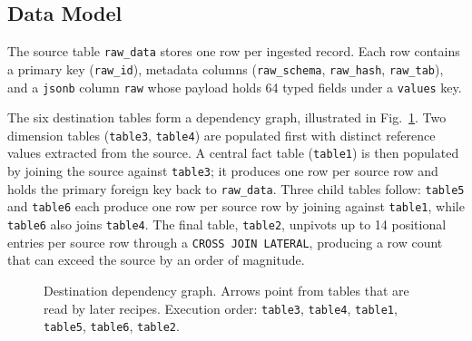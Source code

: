 \documentclass[journal]{IEEEtran}
\begin{document}
\subsection{Data Model}
\label{sec:datamodel}

The source table \texttt{raw\_data} stores one row per ingested record.
Each row contains a primary key (\texttt{raw\_id}), metadata columns (\texttt{raw\_schema}, \texttt{raw\_hash}, \texttt{raw\_tab}), and a \texttt{jsonb} column \texttt{raw} whose payload holds 64 typed fields under a \texttt{values} key.

The six destination tables form a dependency graph, illustrated in Fig.~\ref{fig:dependencies}.
Two dimension tables (\texttt{table3}, \texttt{table4}) are populated first with distinct reference values extracted from the source.
A central fact table (\texttt{table1}) is then populated by joining the source against \texttt{table3}; it produces one row per source row and holds the primary foreign key back to \texttt{raw\_data}.
Three child tables follow: \texttt{table5} and \texttt{table6} each produce one row per source row by joining against \texttt{table1}, while \texttt{table6} also joins \texttt{table4}.
The final table, \texttt{table2}, unpivots up to 14 positional entries per source row through a \texttt{CROSS JOIN LATERAL}, producing a row count that can exceed the source by an order of magnitude.

\begin{figure}[!ht]
\centering
{}
\caption{Destination dependency graph. Arrows point from tables that are read by later recipes. Execution order: \texttt{table3}, \texttt{table4}, \texttt{table1}, \texttt{table5}, \texttt{table6}, \texttt{table2}.}
\label{fig:dependencies}
\end{figure}
\end{document}
